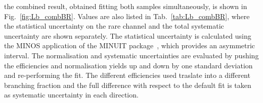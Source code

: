 %
%
%
%
%
%
the combined result, obtained fitting both samples simultaneously, is shown in Fig.~\ref{fig:Lb_combBR}.
Values are also listed in Tab.~\ref{tab:Lb_combBR}, where the statistical
uncertainty on the rare channel and the total systematic uncertainty are shown separately.
The statistical uncertainty is calculated using the MINOS application of the MINUIT package~\cite{James:1975dr},
which provides an asymmetric interval.
The normalisation and systematic uncertainties are evaluated by pushing the efficiencies and normalisation yields
up and down by one standard deviation and re-performing the fit.
The different efficiencies used traslate into a different branching fraction and the full difference with respect 
to the default  fit is taken as systematic uncertainty in each direction.


